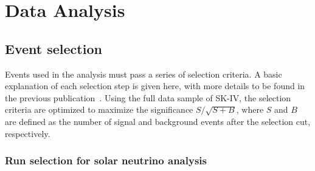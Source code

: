 \documentclass[aps,prd,reprint,superscriptaddress,floatfix,altaffilletter,nofootinbib]{revtex4-2}
\begin{document}
\section{Data Analysis} \label{sec_data_ana}
\subsection{Event selection}

Events used in the analysis must pass a series of selection criteria. 
A basic explanation of each selection step is given here, with more details to be found in the previous publication~\cite{Abe:2016nxk}. 
Using the full data sample of SK-IV, the selection criteria are optimized to maximize the significance $S/\sqrt{S+B}$, where $S$ and $B$ are defined as the number of signal and background events after the selection cut, respectively. 

\subsubsection{Run selection for solar neutrino analysis} \label{sec_runselection}
\end{document}
